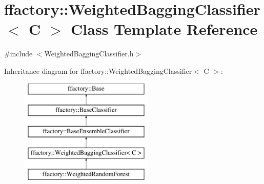 \hypertarget{classffactory_1_1_weighted_bagging_classifier}{\section{ffactory\-:\-:Weighted\-Bagging\-Classifier$<$ C $>$ Class Template Reference}
\label{classffactory_1_1_weighted_bagging_classifier}
}


{\ttfamily \#include $<$Weighted\-Bagging\-Classifier.\-h$>$}

Inheritance diagram for ffactory\-:\-:Weighted\-Bagging\-Classifier$<$ C $>$\-:\begin{figure}[H]
\begin{center}
\leavevmode
\includegraphics[height=5.000000cm]{classffactory_1_1_weighted_bagging_classifier}
\end{center}
\end{figure}
